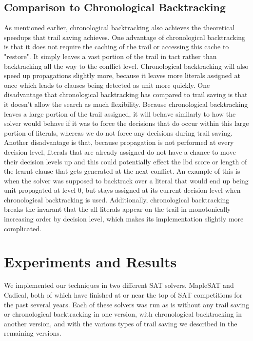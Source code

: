 \documentclass{article}
\begin{document}
\subsection{Comparison to Chronological Backtracking}
As mentioned earlier, chronological backtracking also achieves the theoretical speedups that trail saving achieves. One advantage of chronological backtracking is that it does not require the caching of the trail or accessing this cache to "restore". It simply leaves a vast portion of the trail in tact rather than backtracking all the way to the conflict level. Chronological backtracking will also speed up propagations slightly more, because it leaves more literals assigned at once which leads to clauses being detected as unit more quickly. One disadvantage that chronological backtracking has compared to trail saving is that it doesn't allow the search as much flexibility. Because chronological backtracking leaves a large portion of the trail assigned, it will behave similarly to how the solver would behave if it was to force the decisions that do occur within this large portion of literals, whereas we do not force any decisions during trail saving. Another disadvantage is that, because propagation is not performed at every decision level, literals that are already assigned do not have a chance to move their decision levels up and this could potentially effect the lbd score or length of the learnt clause that gets generated at the next conflict. An example of this is when the solver was supposed to backtrack over a literal that would end up being unit propagated at level 0, but stays assigned at its current decision level when chronological backtracking is used. Additionally, chronological backtracking breaks the invarant that the all literals appear on the trail in monotonically increasing order by decision level, which makes its implementation slightly more complicated.

\section{Experiments and Results}
We implemented our techniques in two different SAT solvers, MapleSAT and Cadical, both of which have finished at or near the top of SAT competitions for the past several years. Each of these solvers was run as is without any trail saving or chronological backtracking in one version, with chronological backtracking in another version, and with the various types of trail saving we described in the remaining versions.
\end{document}
